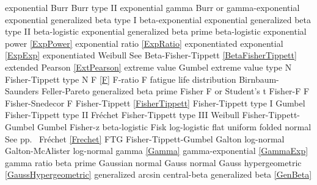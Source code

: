 exponential Burr				\dotfill	Burr type II 						\ncite	%
exponential gamma				\dotfill	Burr or gamma-exponential		  		%
exponential generalized beta type I 	\dotfill	beta-exponential			 	%
exponential generalized beta type II 	\dotfill	beta-logistic				 	%
exponential generalized beta prime 	\dotfill	beta-logistic					\ncite	%
exponential power				\dotfill	\eqref{ExpPower}					\ncite
exponential ratio				\dotfill	\eqref{ExpRatio}					\ncite	%
exponentiated exponential		\dotfill	\eqref{ExpExp}						\ncite	%
exponentiated Weibull 			\dotfill	See Beta-Fisher-Tippett \eqref{BetaFisherTippett}\ncite
extended Pearson				\dotfill	\eqref{ExtPearson}					\ncite
extreme value					\dotfill	Gumbel 								\ncite
extreme value type N 			\dotfill	Fisher-Tippett type N 				\ncite	%
%
F								\dotfill	\eqref{F} 							\ncite	%
F-ratio							\dotfill	F									\ncite	%
fatigue life distribution		\dotfill	Birnbaum-Saunders					\ncite
Feller-Pareto					\dotfill	generalized beta prime 				\ncite	%
Fisher							\dotfill	F or Student's t 					\ncite	%
Fisher-F 						\dotfill	F 									\ncite	%
Fisher-Snedecor 				\dotfill	F 									\ncite	%
Fisher-Tippett					\dotfill	\eqref{FisherTippett} 				\ncite	%
Fisher-Tippett type I			\dotfill	Gumbel 								\ncite	%
Fisher-Tippett type II			\dotfill	Fr\'{e}chet  						\ncite	%
Fisher-Tippett type III			\dotfill	Weibull 							\ncite	%
Fisher-Tippett-Gumbel			\dotfill	Gumbel  							\ncite	%
Fisher-z						\dotfill	beta-logistic						\ncite	%
Fisk							\dotfill	log-logistic						\ncite 	%
flat 							\dotfill	uniform 							\ncite	%
folded normal					\dotfill    See pp.~\pageref{FoldedNormal}		\ncite
Fr\'{e}chet 					\dotfill	\eqref{Frechet} 					\ncite	%
FTG								\dotfill	Fisher-Tippett-Gumbel 				\ncite	%
%
Galton							\dotfill	log-normal 							\ncite	%
Galton-McAlister				\dotfill	log-normal 							\ncite	%
gamma							\dotfill	\eqref{Gamma} 						\ncite	%
gamma-exponential				\dotfill	\eqref{GammaExp}					\ncite	%
gamma ratio						\dotfill	beta prime							\ncite	%
Gaussian 						\dotfill	normal 								\ncite	%
Gauss 							\dotfill	normal 								\ncite	%
Gauss hypergeometric			\dotfill	\eqref{GaussHypergeometric}			\ncite
generalized arcsin				\dotfill	central-beta	 					   	%
generalized beta 				\dotfill	\eqref{GenBeta} 					\ncite	%
